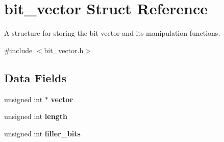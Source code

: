 \hypertarget{structbit__vector}{\section{bit\-\_\-vector \-Struct \-Reference}
\label{structbit__vector}
}


\-A structure for storing the bit vector and its manipulation-\/functions.  




{\ttfamily \#include $<$bit\-\_\-vector.\-h$>$}

\subsection*{\-Data \-Fields}
\begin{DoxyCompactItemize}
\item 
\hypertarget{structbit__vector_a5cb75e67c85fc78ba820c8502b996904}{unsigned int $\ast$ {\bfseries vector}}\label{structbit__vector_a5cb75e67c85fc78ba820c8502b996904}

\item 
\hypertarget{structbit__vector_ab51b1a5df35a82705c077da561247770}{unsigned int {\bfseries length}}\label{structbit__vector_ab51b1a5df35a82705c077da561247770}

\item 
\hypertarget{structbit__vector_a08db70e17d134b962a58b3a28d96696b}{unsigned int {\bfseries filler\-\_\-bits}}\label{structbit__vector_a08db70e17d134b962a58b3a28d96696b}


\end{DoxyCompactItemize}
